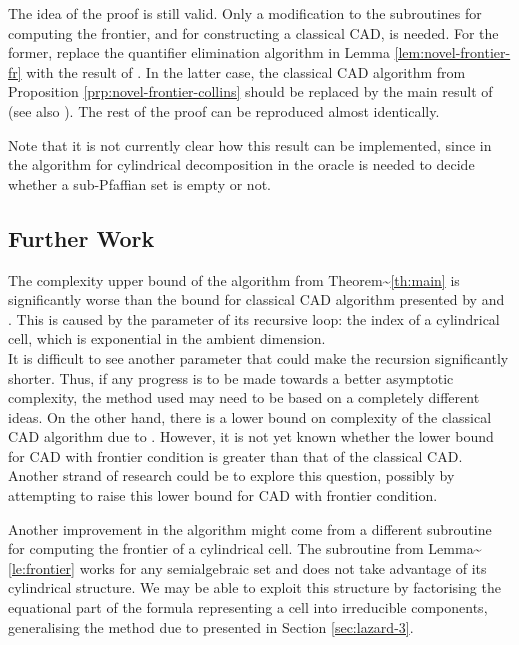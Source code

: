 \documentclass[
]{book}
\theoremstyle{definition}
\theoremstyle{definition}
\theoremstyle{definition}
\theoremstyle{definition}
\theoremstyle{remark}
\begin{document}
The idea of the proof is still valid. Only a modification to the subroutines for computing the frontier, and for constructing a classical CAD, is needed. For the former, replace the quantifier elimination algorithm in Lemma \ref{lem:novel-frontier-fr} with the result of \citep[Section 5]{gv04}. In the latter case, the classical CAD algorithm from Proposition \ref{prp:novel-frontier-collins} should be replaced by the main result of \citet{gv01} (see also \citep[Section 7]{gv04}). The rest of the proof can be reproduced almost identically.

Note that it is not currently clear how this result can be implemented, since in the algorithm for cylindrical decomposition in \citet{gv01} the oracle is needed to decide whether a sub-Pfaffian set is empty or not.

\hypertarget{further-work}{%
\subsection{Further Work}\label{further-work}}

The complexity upper bound of the algorithm from Theorem\textasciitilde{}\ref{th:main} is significantly worse than the bound
for classical CAD algorithm presented by \citet{collins1975} and \citet{wuthrich2005}.
This is caused by the parameter of its recursive loop: the index of a cylindrical cell, which is exponential in the ambient dimension.\\
It is difficult to see another parameter that could make the recursion significantly shorter. Thus, if any progress is to be made towards a better asymptotic complexity, the method used may need to be based on a completely different ideas.
On the other hand, there is a lower bound on complexity of the classical CAD algorithm due to \citet{davenportHeintz1988}. However, it is not yet known whether the lower bound for CAD with frontier condition is greater than that of the classical CAD.
Another strand of research could be to explore this question, possibly by attempting to raise this lower bound for CAD with frontier condition.

Another improvement in the algorithm might come from a different subroutine for computing the frontier
of a cylindrical cell.
The subroutine from Lemma\textasciitilde{}\ref{le:frontier} works for any semialgebraic set and does not take advantage of its
cylindrical structure.
We may be able to exploit this structure by factorising the equational part of the formula
representing a cell into irreducible components, generalising the method due to \citet{lazard10} presented in Section \ref{sec:lazard-3}.
\end{document}
